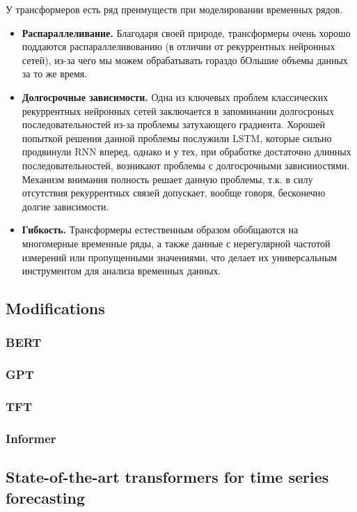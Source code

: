 У трансформеров есть ряд преимуществ при моделировании временных рядов.
\begin{itemize}
    \item \textbf{Распараллеливание.} Благодаря своей природе, трансформеры очень хорошо 
    поддаются распараллеливованию (в отличии от рекуррентных нейронных сетей), из-за 
    чего мы можем обрабатывать гораздо бОльшие объемы данных за то же время.
    \item \textbf{Долгосрочные зависимости.} Одна из ключевых проблем классических 
    рекуррентных нейронных сетей заключается в запоминании долгосроных последовательностей 
    из-за проблемы затухающего градиента. Хорошей попыткой решения данной проблемы 
    послужили LSTM, которые сильно продвинули RNN вперед, однако и у тех, при обработке 
    достаточно длинных последовательностей, возникают проблемы с долгосрочными зависииостями. 
    Механизм внимания полность решает данную проблемы, т.к. в силу отсутствия рекуррентных 
    связей допускает, вообще говоря, бесконечно долгие зависимости.
    \item \textbf{Гибкость.} Трансформеры естественным образом обобщаются на многомерные 
    временные ряды, а также данные с нерегулярной частотой измерений или пропущенными значениями, 
    что делает их универсальным инструментом для анализа временных данных.
\end{itemize}

\subsection{\color{red}Modifications}


\subsubsection{\color{red}BERT}


\subsubsection{\color{red}GPT}
\subsubsection{\color{red}TFT}
\subsubsection{\color{red}Informer}

\subsection{\color{red}State-of-the-art transformers for time series forecasting}





